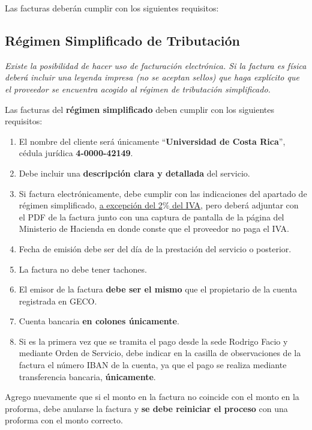 \documentclass[12pt]{article}
\newenvironment{significant}{\begin{center}\begin{minipage}{0.9\textwidth}\centering\em}{\end{minipage}\end{center}}
\begin{document}
Las facturas deberán cumplir con los siguientes requisitos:

\subsection{Régimen Simplificado de Tributación}

\begin{significant}
Existe la posibilidad de hacer uso de facturación electrónica. Si la factura es física deberá incluir una leyenda impresa (no se aceptan sellos) que haga explícito que el proveedor se encuentra acogido al régimen de tributación simplificado.
\end{significant}

Las facturas del \textbf{régimen simplificado} deben cumplir con los siguientes requisitos: 

\begin{enumerate}
    \item El nombre del cliente será únicamente “\textbf{Universidad de Costa Rica}”, cédula jurídica
\textbf{4-0000-42149}.
    \item Debe incluir una \textbf{descripción clara y detallada} del servicio.
    \item Si factura electrónicamente, debe cumplir con las indicaciones del apartado de régimen
simplificado, \underline{a excepción del 2$\%$ del IVA}, pero deberá adjuntar con el PDF de la factura junto con una
captura de pantalla de la página del Ministerio de Hacienda en donde conste que el proveedor no paga el
IVA.
    \item Fecha de emisión debe ser del día de la prestación del servicio o posterior.
    \item La factura no debe tener tachones.
    \item El emisor de la factura \textbf{debe ser el mismo} que el propietario de la cuenta registrada en GECO.
    \item Cuenta bancaria \textbf{en colones únicamente}.
    \item Si es la primera vez que se tramita el pago desde la sede Rodrigo Facio y mediante Orden de Servicio, debe indicar en la casilla de observaciones de la factura el número IBAN de la cuenta, ya que el pago se realiza mediante transferencia bancaria, \textbf{únicamente}.
\end{enumerate}

Agrego nuevamente que si el monto en la factura no coincide con el monto en la proforma, debe anularse la factura y \textbf{se debe reiniciar el proceso} con una proforma con el monto correcto.
\end{document}

